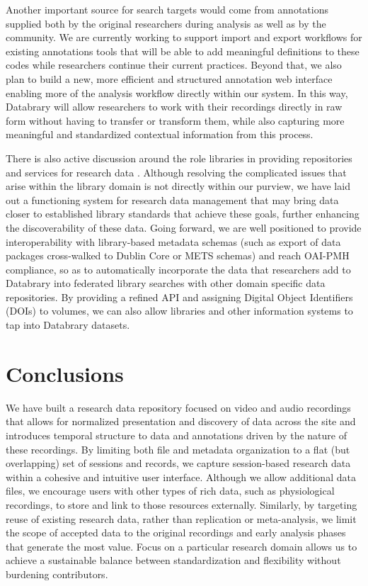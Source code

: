\documentclass{sig-alternate}
\begin{document}
Another important source for search targets would come from annotations supplied both by the original researchers during analysis as well as by the community.
We are currently working to support import and export workflows for existing annotations tools that will be able to add meaningful definitions to these codes while researchers continue their current practices.
Beyond that, we also plan to build a new, more efficient and structured annotation web interface enabling more of the analysis workflow directly within our system.
In this way, Databrary will allow researchers to work with their recordings directly in raw form without having to transfer or transform them, while also capturing more meaningful and standardized contextual information from this process.

There is also active discussion around the role libraries in providing repositories and services for research data \cite{Castelli_etal_2013,Nielson_Hjørland_2014,Macmillan_2014,Pinfield_etal_2014}.
Although resolving the complicated issues that arise within the library domain is not directly within our purview, we have laid out a functioning system for research data management that may bring data closer to established library standards that achieve these goals, further enhancing the discoverability of these data.
Going forward, we are well positioned to provide interoperability with library-based metadata schemas (such as export of data packages cross-walked to Dublin Core or METS schemas) and reach OAI-PMH compliance, so as to automatically incorporate the data that researchers add to Databrary into federated library searches with other domain specific data repositories.
By providing a refined API and assigning Digital Object Identifiers (DOIs) to volumes, we can also allow libraries and other information systems to tap into Databrary datasets.

\section{Conclusions}

We have built a research data repository focused on video and audio recordings that allows for normalized presentation and discovery of data across the site and introduces temporal structure to data and annotations driven by the nature of these recordings.
By limiting both file and metadata organization to a flat (but overlapping) set of sessions and records, we capture session-based research data within a cohesive and intuitive user interface.
Although we allow additional data files, we encourage users with other types of rich data, such as physiological recordings, to store and link to those resources externally.
Similarly, by targeting reuse of existing research data, rather than replication or meta-analysis, we limit the scope of accepted data to the original recordings and early analysis phases that generate the most value.
Focus on a particular research domain allows us to achieve a sustainable balance between standardization and flexibility without burdening contributors.
\end{document}
